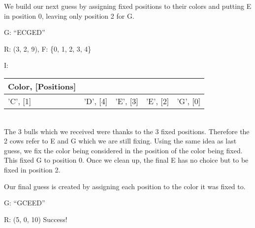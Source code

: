 \documentclass[11pt]{article}
\begin{document}
    We build our next guess by assigning fixed positions to their colors and putting E in position 0, leaving only position 2 for G.

    \noindent G: \enquote{ECGED}

    \noindent R: (3, 2, 9), F: \{0, 1, 2, 3, 4\}

    \noindent I: \begin{tabularx}{\textwidth}{|X|X|X|X|X|}
        \hline
        Color, [Positions]&&&&\\\hline 
        'C', [1]&'D', [4]&'E', [3]&'E', [2]&'G', [0]\\\hline
    \end{tabularx}\\

    The 3 bulls which we received were thanks to the 3 fixed positions. Therefore the 2 cows refer to E and G which we are still fixing. Using the same idea as last guess, we fix the color being considered in the position of the color being fixed. This fixed G to position 0. Once we clean up, the final E has no choice but to be fixed in position 2.

    Our final guess is created by assigning each position to the color it was fixed to.

    \noindent G: \enquote{GCEED}
    
    \noindent R: (5, 0, 10) Success!

\end{document}
